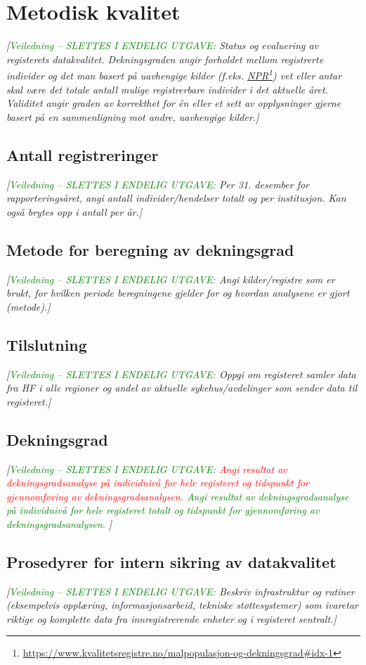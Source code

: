 \documentclass[norsk, a4paper, twocolumn]{report}
\newcommand{\newtext}[1]{\cbstart\textcolor{green}{#1\cbend}}
\newcommand{\oldtext}[1]{\cbdelete\textcolor{red}{#1}}
\newcommand{\guide}[1] {
	\textit{[\textcolor{guidegray}{\newtext{Veiledning -- SLETTES I ENDELIG
	UTGAVE:} #1}]}
	}
\begin{document}
\chapter{Metodisk kvalitet}\label{cha:kva}
\guide{Status og evaluering av registerets  datakvalitet.
Dekningsgraden angir
forholdet mellom registrerte individer og det man basert på uavhengige
kilder (f.eks.
\href{https://www.kvalitetsregistre.no/malpopulasjon-og-dekningsgrad\#idx-1}
{NPR}\footnote{\url{https://www.kvalitetsregistre.no/malpopulasjon-og-dekningsgrad\#idx-1}})
vet eller antar skal være det totale antall mulige registrerbare
individer i det aktuelle året. Validitet angir graden av korrekthet for én eller
et sett av opplysninger gjerne basert på en sammenligning mot andre, uavhengige
kilder.}

\section{Antall registreringer}\label{sec:reg}
\guide{Per 31. desember for rapporteringsåret, angi antall
individer/hendelser totalt og per institusjon. Kan også brytes opp i
antall per år.}

\section{Metode for beregning av dekningsgrad}\label{sec:met}
\guide{Angi kilder/registre som er brukt, for hvilken periode beregningene
gjelder for og hvordan analysene er gjort (metode).}

\section{Tilslutning}\label{sec:endek}
\guide{Oppgi om registeret samler data fra HF i alle regioner og andel
av aktuelle sykehus/avdelinger som sender data til registeret.}

\section{Dekningsgrad}\label{sec:obs}
\guide{
	\oldtext{Angi resultat av dekningsgradsanalyse på individnivå for hele
	registeret og tidspunkt for gjennomføring av dekningsgradsanalysen.}
	\newtext{
	Angi resultat av dekningsgradsanalyse på individnivå for hele
	registeret totalt og tidspunkt for gjennomføring av
	dekningsgradsanalysen.
	}}

\section{Prosedyrer for intern sikring av datakvalitet}\label{sec:sik}
\guide{Beskriv infrastruktur og rutiner (eksempelvis
opplæring, informasjonsarbeid, tekniske støttesystemer) som ivaretar
riktige og komplette data fra innregistrerende enheter og i registeret
sentralt.}
\end{document}
